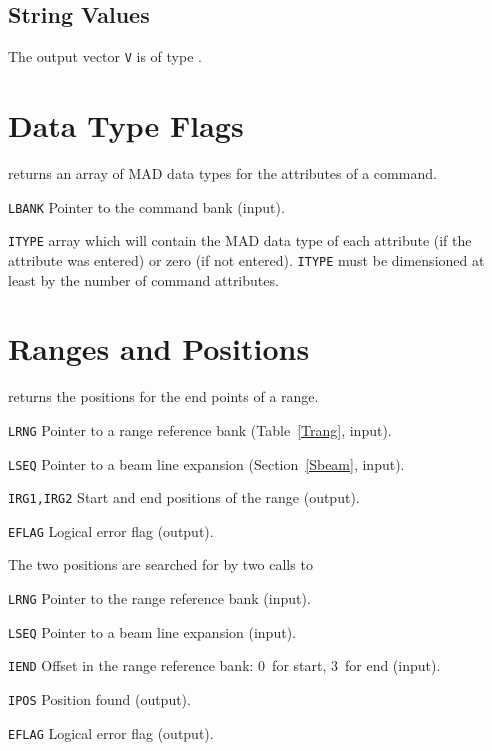 \subsection{String Values}
\label{UTGSTR}
The output vector {\tt V} is of type .

\section{Data Type Flags}
\label{UTGTYP}
returns an array of MAD data types for the attributes of a command.
\begin{mylist}
\item[\tt LBANK]
Pointer to the command bank (input).
\item[\tt ITYPE]
 array which will contain the MAD data type of each
attribute (if the attribute was entered) or zero (if not entered).     
{\tt ITYPE} must be dimensioned at least by the number of command
attributes.
\end{mylist}

\section{Ranges and Positions}
\label{UTGRNG}
returns the positions for the end points of a range.
\begin{mylist}
\item[\tt LRNG]
Pointer to a range reference bank (Table~\ref{Trang}, input).
\item[\tt LSEQ]
Pointer to a beam line expansion (Section~\ref{Sbeam}, input).
\item[\tt IRG1,IRG2]
Start and end positions of the range (output).
\item[\tt EFLAG]
Logical error flag (output).
\end{mylist}

The two positions are searched for by two calls to
\begin{mylist}
\item[\tt LRNG]
Pointer to the range reference bank (input).
\item[\tt LSEQ]
Pointer to a beam line expansion (input).
\item[\tt IEND]
Offset in the range reference bank: 0~for start, 3~for end (input).
\item[\tt IPOS]
Position found (output).
\item[\tt EFLAG]
Logical error flag (output).
\end{mylist}

